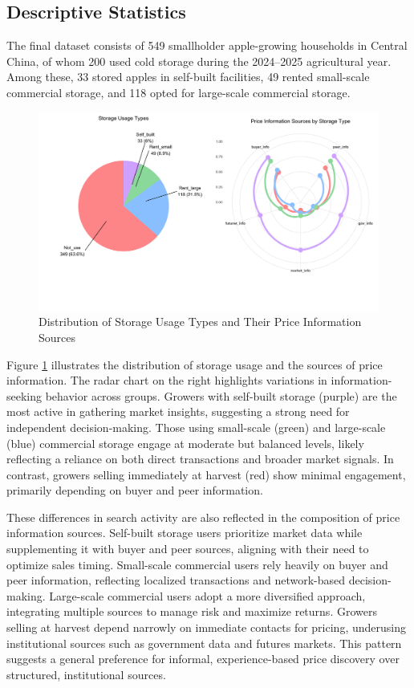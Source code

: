 \subsection{Descriptive Statistics}  
\noindent The final dataset consists of 549 smallholder apple-growing households in Central China, of whom 200 used cold storage during the 2024–2025 agricultural year. Among these, 33 stored apples in self-built facilities, 49 rented small-scale commercial storage, and 118 opted for large-scale commercial storage.  

\begin{figure}[htp]
\centering
\includegraphics[width=1\textwidth]{figures/storage_usage_analysis_soft_colors.png}
\caption{Distribution of Storage Usage Types and Their Price Information Sources}
\label{Figure: pie and radar chart}
\end{figure}

Figure \ref{Figure: pie and radar chart} illustrates the distribution of storage usage and the sources of price information. The radar chart on the right highlights variations in information-seeking behavior across groups. Growers with self-built storage (purple) are the most active in gathering market insights, suggesting a strong need for independent decision-making. Those using small-scale (green) and large-scale (blue) commercial storage engage at moderate but balanced levels, likely reflecting a reliance on both direct transactions and broader market signals. In contrast, growers selling immediately at harvest (red) show minimal engagement, primarily depending on buyer and peer information.  

These differences in search activity are also reflected in the composition of price information sources. Self-built storage users prioritize market data while supplementing it with buyer and peer sources, aligning with their need to optimize sales timing. Small-scale commercial users rely heavily on buyer and peer information, reflecting localized transactions and network-based decision-making. Large-scale commercial users adopt a more diversified approach, integrating multiple sources to manage risk and maximize returns. Growers selling at harvest depend narrowly on immediate contacts for pricing, underusing institutional sources such as government data and futures markets. This pattern suggests a general preference for informal, experience-based price discovery over structured, institutional sources.

